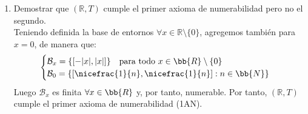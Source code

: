\documentclass[12pt]{article}
\begin{document}
\begin{ejercicio}
\begin{enumerate}
        La base de entornos más económica (de cardinal 1) viene dada por:
        \[
            \mathcal{B}_x = \{[-x, x]\} \text{ si } x > 0, \qquad \mathcal{B}_x = \{[x, -x]\} \text{ si } x < 0
        \]
        (es decir, $\mathcal{B}_x = \{[-|x|, |x|]\}$ para todo $x \in \bb{R} \setminus \{0\}$).
        \\Probemos que $\mathcal{B}_x$ es efectivamente una base de entornos para cada $x \in \bb{R} \setminus \{0\}$:
        \begin{itemize}
            \item \textbf{Reflexividad puntual:} $\mathcal{B}_x \neq \emptyset$ y para el único elemento $V = [-|x|, |x|] \in \mathcal{B}_x$ se cumple claramente que $x \in [-|x|, |x|] = V$.
            
            \item \textbf{Intersección finita:} Sean $V_1, V_2 \in \mathcal{B}_x$. Como $\mathcal{B}_x$ es unitaria, necesariamente $V_1 = V_2 = [-|x|, |x|]$. Tomando $V_3 = [-|x|, |x|] \in \mathcal{B}_x$, se verifica trivialmente que $V_3 \subseteq V_1 \cap V_2$.
            
            \item \textbf{Axioma de Bourbaki:} Sea $V = [-|x|, |x|] \in \mathcal{B}_x$. Como $|x| > 0$, tenemos que $V \in \mathcal{B} \subseteq T$ es decir, $V$ ya es abierto, luego entorno de todos sus puntos por un entorno básico ($\forall y\in V \quad \exists V_y\in \mathcal{B}_y$ tal que  $y\in V_y\in V$)
        \end{itemize}
        Probado así que $\mathcal{B}_x$ conforma una base de entornos para cada $x \neq 0$.
                
        \item Demostrar que $(\mathbb{R}, T)$ cumple el primer axioma de numerabilidad pero no el segundo.
        \\Teniendo definida la base de entornos $\forall x\in \mathbb{R}\setminus\{0\}$, agregemos también para $x=0$, de manera que:
        \[\begin{cases}
            \mathcal{B}_x = \{[-|x|, |x|]\} \quad\text{para todo } x \in \bb{R} \setminus \{0\}\\
            \mathcal{B}_0 = \left\{\left[\nicefrac{1}{n}, \nicefrac{1}{n}\right] : n \in \bb{N}\right\}
        \end{cases}\]
        Luego $\mathcal{B}_x$ es finita $\forall x\in \bb{R}$ y, por tanto, numerable. Por tanto, $(\mathbb{R}, T)$ cumple el primer axioma de numerabilidad (1AN).\\


\end{enumerate}
\end{ejercicio}
\end{document}
